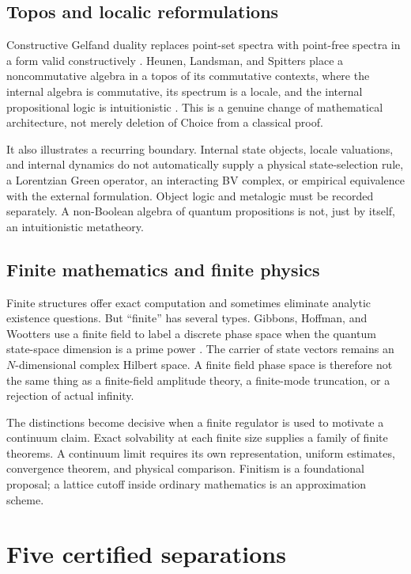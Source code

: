 \documentclass[11pt]{article}
\theoremstyle{definition}
\theoremstyle{remark}
\begin{document}
\subsection{Topos and localic reformulations}

Constructive Gelfand duality replaces point-set spectra with point-free
spectra in a form valid constructively \cite{CoquandSpitters2009}.
Heunen, Landsman, and Spitters place a noncommutative algebra in a topos of its
commutative contexts, where the internal algebra is commutative, its spectrum
is a locale, and the internal propositional logic is intuitionistic
\cite{HeunenLandsmanSpitters2009}.  This is a genuine change of mathematical
architecture, not merely deletion of Choice from a classical proof.

It also illustrates a recurring boundary.  Internal state objects, locale
valuations, and internal dynamics do not automatically supply a physical
state-selection rule, a Lorentzian Green operator, an interacting BV complex,
or empirical equivalence with the external formulation.  Object logic and
metalogic must be recorded separately.  A non-Boolean algebra of quantum
propositions is not, just by itself, an intuitionistic metatheory.

\subsection{Finite mathematics and finite physics}

Finite structures offer exact computation and sometimes eliminate analytic
existence questions.  But ``finite'' has several types.  Gibbons, Hoffman, and
Wootters use a finite field to label a discrete phase space when the quantum
state-space dimension is a prime power \cite{GibbonsHoffmanWootters2004}.
The carrier of state vectors remains an \(N\)-dimensional complex Hilbert
space.  A finite field phase space is therefore not the same thing as a
finite-field amplitude theory, a finite-mode truncation, or a rejection of
actual infinity.

The distinctions become decisive when a finite regulator is used to motivate
a continuum claim.  Exact solvability at each finite size supplies a family
of finite theorems.  A continuum limit requires its own representation,
uniform estimates, convergence theorem, and physical comparison.  Finitism
is a foundational proposal; a lattice cutoff inside ordinary mathematics is
an approximation scheme.

\section{Five certified separations}
\label{sec:cases}
\end{document}
